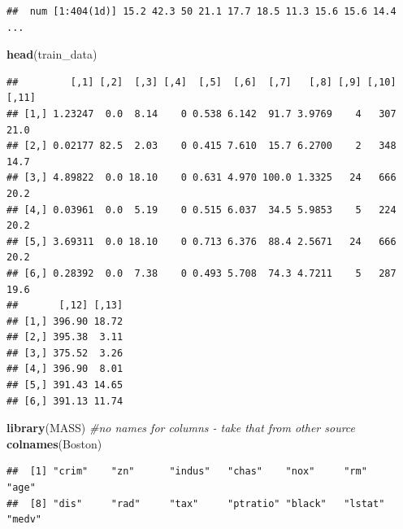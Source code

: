 \documentclass[10pt,ignorenonframetext,]{beamer}
\newenvironment{Shaded}{\begin{snugshade}}{\end{snugshade}}
\newcommand{\KeywordTok}[1]{\textcolor[rgb]{0.13,0.29,0.53}{\textbf{#1}}}
\newcommand{\StringTok}[1]{\textcolor[rgb]{0.31,0.60,0.02}{#1}}
\newcommand{\CommentTok}[1]{\textcolor[rgb]{0.56,0.35,0.01}{\textit{#1}}}
\newcommand{\OperatorTok}[1]{\textcolor[rgb]{0.81,0.36,0.00}{\textbf{#1}}}
\newcommand{\NormalTok}[1]{#1}
\begin{document}
\begin{frame}[fragile]

\begin{Shaded}
\end{Shaded}

\begin{verbatim}
##  num [1:404(1d)] 15.2 42.3 50 21.1 17.7 18.5 11.3 15.6 15.6 14.4 ...
\end{verbatim}

\begin{Shaded}
\begin{Highlighting}[]
\KeywordTok{head}\NormalTok{(train_data)}
\end{Highlighting}
\end{Shaded}

\begin{verbatim}
##         [,1] [,2]  [,3] [,4]  [,5]  [,6]  [,7]   [,8] [,9] [,10] [,11]
## [1,] 1.23247  0.0  8.14    0 0.538 6.142  91.7 3.9769    4   307  21.0
## [2,] 0.02177 82.5  2.03    0 0.415 7.610  15.7 6.2700    2   348  14.7
## [3,] 4.89822  0.0 18.10    0 0.631 4.970 100.0 1.3325   24   666  20.2
## [4,] 0.03961  0.0  5.19    0 0.515 6.037  34.5 5.9853    5   224  20.2
## [5,] 3.69311  0.0 18.10    0 0.713 6.376  88.4 2.5671   24   666  20.2
## [6,] 0.28392  0.0  7.38    0 0.493 5.708  74.3 4.7211    5   287  19.6
##       [,12] [,13]
## [1,] 396.90 18.72
## [2,] 395.38  3.11
## [3,] 375.52  3.26
## [4,] 396.90  8.01
## [5,] 391.43 14.65
## [6,] 391.13 11.74
\end{verbatim}

\begin{Shaded}
\begin{Highlighting}[]
\KeywordTok{library}\NormalTok{(MASS)  }\CommentTok{#no names for columns - take that from other source}
\KeywordTok{colnames}\NormalTok{(Boston)}
\end{Highlighting}
\end{Shaded}

\begin{verbatim}
##  [1] "crim"    "zn"      "indus"   "chas"    "nox"     "rm"      "age"    
##  [8] "dis"     "rad"     "tax"     "ptratio" "black"   "lstat"   "medv"
\end{verbatim}


\end{frame}
\end{document}
